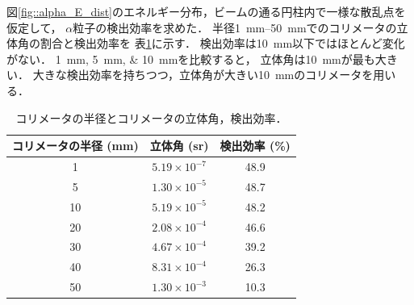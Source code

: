 \documentclass[../master]{subfiles}
\begin{document}
図\ref{fig::alpha_E_dist}のエネルギー分布，ビームの通る円柱内で一様な散乱点を仮定して，
$\alpha$粒子の検出効率を求めた．
半径\SIrange{1}{50}{\milli\metre}でのコリメータの立体角の割合と検出効率を
表\ref{tab::solid_angle_percent}に示す．
検出効率は\SI{10}{\milli\metre}以下ではほとんど変化がない．
\SIlist{1;5;10}{\milli\metre}を比較すると，
立体角は\SI{10}{\milli\metre}が最も大きい．
大きな検出効率を持ちつつ，立体角が大きい\SI{10}{\milli\metre}のコリメータを用いる．
\begin{table}
  \centering
  \caption{コリメータの半径とコリメータの立体角，検出効率．}
  \label{tab::solid_angle_percent}
  \begin{tabular}{ccc}
    \toprule
    コリメータの半径 (\si{\milli\metre}) & 立体角 (\si{\steradian}) & 検出効率 (\si{\percent})\\%
    \midrule
     1 & $5.19\times10^{-7}$ & 48.9 \\
     5 & $1.30\times10^{-5}$ & 48.7 \\%
    10 & $5.19\times10^{-5}$ & 48.2 \\%
    20 & $2.08\times10^{-4}$ & 46.6 \\%
    30 & $4.67\times10^{-4}$ & 39.2 \\%
    40 & $8.31\times10^{-4}$ & 26.3 \\%
    50 & $1.30\times10^{-3}$ & 10.3 \\%
    \bottomrule
  \end{tabular}
\end{table}
\end{document}
